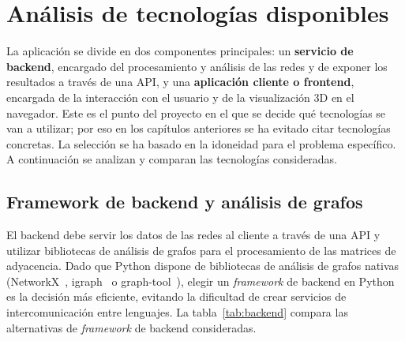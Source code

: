 \section{Análisis de tecnologías disponibles}

La aplicación se divide en dos componentes principales: un \textbf{servicio de backend}, encargado
del procesamiento y análisis de las redes y de exponer los resultados a través de una API, y una
\textbf{aplicación cliente o frontend}, encargada de la interacción con el usuario y de la
visualización 3D en el navegador. Este es el punto del proyecto en el que se decide qué tecnologías
se van a utilizar; por eso en los capítulos anteriores se ha evitado citar tecnologías concretas. La
selección se ha basado en la idoneidad para el problema específico. A continuación se analizan y
comparan las tecnologías consideradas.

\subsection{Framework de backend y análisis de grafos}

El backend debe servir los datos de las redes al cliente a través de una API y utilizar bibliotecas
de análisis de grafos para el procesamiento de las matrices de adyacencia. Dado que Python dispone de
bibliotecas de análisis de grafos nativas (NetworkX~\cite{networkx}, igraph~\cite{igraph} o
graph-tool~\cite{graphtool}), elegir un \textit{framework} de backend en Python es la decisión más
eficiente, evitando la dificultad de crear servicios de intercomunicación entre lenguajes. La
tabla~\ref{tab:backend} compara las alternativas de \textit{framework} de backend consideradas.

